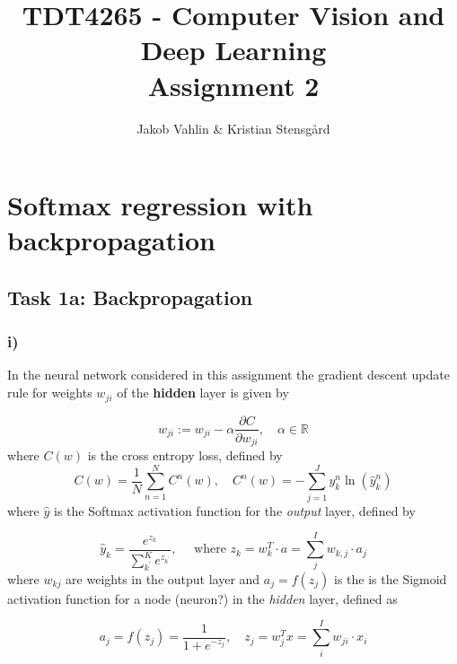 \documentclass{article}
\date{}
\title{TDT4265 - Computer Vision and Deep Learning \\Assignment 2}
\author{Jakob Vahlin & Kristian Stensgård}
\begin{document}
\maketitle

\tableofcontents
\newpage

\section{Softmax regression with backpropagation}
\subsection{Task 1a: Backpropagation}

\subsubsection*{i)}

In the neural network considered in this assignment the gradient descent update rule for weights $w_{ji}$ of the \textbf{hidden} layer is given by

\begin{equation}
    w_{j i}:=w_{j i}-\alpha \frac{\partial C}{\partial w_{j i}} , \quad \alpha \in \mathbb{R}
    \label{eq:1a_start}
\end{equation}
where $C(w)$ is the cross entropy loss, defined by
\begin{equation}
    C(w)=\frac{1}{N} \sum_{n=1}^{N} C^{n}(w), \quad C^{n}(w)=-\sum_{j=1}^{J} y_{k}^{n} \ln \left(\hat{y}_{k}^{n}\right)
    \label{eq:cross_entropy}
\end{equation}
where $\hat{y}$ is the Softmax activation function for the \textit{output} layer, defined by

\begin{equation}
    \hat{y}_{k}=\frac{e^{z_{k}}}{\sum_{k^{\prime}}^{K} e^{z_{k^{\prime}}}}, \quad \text { where } z_{k}=w_{k}^{T} \cdot a=\sum_{j}^{I} w_{k, j} \cdot a_{j}
    \label{eq:softmax}
\end{equation}
where $w_{kj}$ are weights in the output layer and $a_j = f(z_j)$ is the is the Sigmoid activation function for a node (neuron?) in the \textit{hidden} layer, defined as

\begin{equation}
    a_j =  f(z_j)=\frac{1}{1+e^{-z_j}}, \quad z_j = w_j^{T} x=\sum_{i}^{I} w_{ji} \cdot x_{i}
    \label{eq:sigmoid}
\end{equation}
\end{document}
